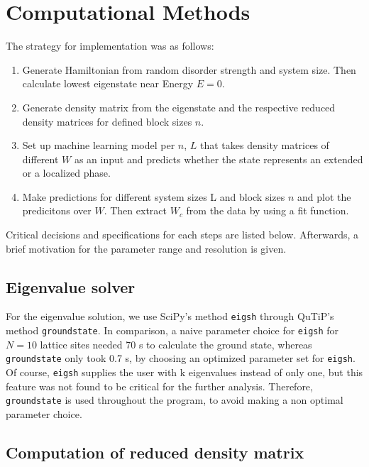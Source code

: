\documentclass[reprint,amsmath,amssymb,aps,prb]{revtex4-2}
\begin{document}
\section{Computational Methods}

The strategy for implementation was as follows:

\begin{enumerate}
	\item Generate Hamiltonian from random disorder strength and system size. Then calculate lowest eigenstate near Energy $E = 0$.
	\item Generate density matrix from the eigenstate and the respective reduced density matrices for defined block sizes $n$.
	\item  Set up machine learning model per $n$, $L$ that takes density matrices of different $W$ as an input and predicts whether the state represents an extended or a localized phase.
	\item Make predictions for different system sizes L and block sizes $n$ and plot the predicitons over $W$. Then extract $W_c$	from the data by using a fit function.
\end{enumerate}

Critical decisions and specifications for each steps are listed below. Afterwards, a brief motivation for the parameter range and resolution is given.

\subsection{Eigenvalue solver}

For the eigenvalue solution, we use SciPy's method \texttt{eigsh} through QuTiP's method \texttt{groundstate}\cite{Virtanen_2020, Johansson2012}. In comparison, a naive parameter choice for \texttt{eigsh} for $N=10$ lattice sites needed 70 s to calculate the ground state, whereas \texttt{groundstate} only took 0.7 s, by choosing an optimized parameter set for \texttt{eigsh}. Of course, \texttt{eigsh} supplies the user with k eigenvalues instead of only one, but this feature was not found to be critical for the further analysis. Therefore, \texttt{groundstate} is used throughout the program, to avoid making a non optimal parameter choice.

\subsection{Computation of reduced density matrix}
\end{document}
